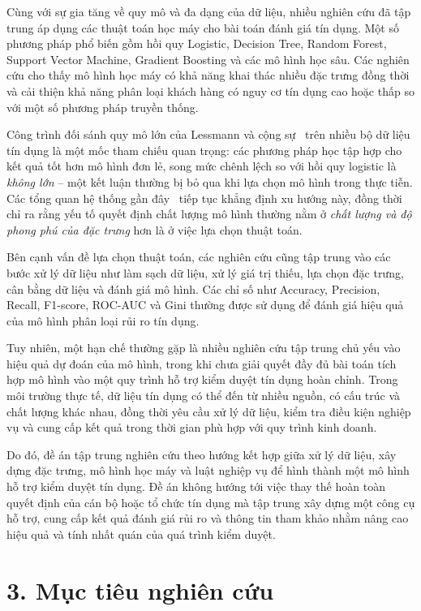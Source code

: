 Cùng với sự gia tăng về quy mô và đa dạng của dữ liệu, nhiều nghiên cứu đã tập
trung áp dụng các thuật toán học máy cho bài toán đánh giá tín dụng. Một số
phương pháp phổ biến gồm hồi quy Logistic, Decision Tree, Random Forest, Support
Vector Machine, Gradient Boosting và các mô hình học sâu. Các nghiên cứu cho thấy
mô hình học máy có khả năng khai thác nhiều đặc trưng đồng thời và cải thiện khả
năng phân loại khách hàng có nguy cơ tín dụng cao hoặc thấp so với một số phương
pháp truyền thống.

Công trình đối sánh quy mô lớn của Lessmann và cộng sự~\cite{lessmann2015} trên
nhiều bộ dữ liệu tín dụng là một mốc tham chiếu quan trọng: các phương pháp học
tập hợp cho kết quả tốt hơn mô hình đơn lẻ, song mức chênh lệch so với hồi quy
logistic là \textit{không lớn} -- một kết luận thường bị bỏ qua khi lựa chọn mô
hình trong thực tiễn. Các tổng quan hệ thống gần đây~\cite{shi2022} tiếp tục
khẳng định xu hướng này, đồng thời chỉ ra rằng yếu tố quyết định chất lượng mô
hình thường nằm ở \textit{chất lượng và độ phong phú của đặc trưng} hơn là ở việc
lựa chọn thuật toán.

Bên cạnh vấn đề lựa chọn thuật toán, các nghiên cứu cũng tập trung vào các bước
xử lý dữ liệu như làm sạch dữ liệu, xử lý giá trị thiếu, lựa chọn đặc trưng, cân
bằng dữ liệu và đánh giá mô hình. Các chỉ số như Accuracy, Precision, Recall,
F1-score, ROC-AUC và Gini thường được sử dụng để đánh giá hiệu quả của mô hình
phân loại rủi ro tín dụng.

Tuy nhiên, một hạn chế thường gặp là nhiều nghiên cứu tập trung chủ yếu vào hiệu
quả dự đoán của mô hình, trong khi chưa giải quyết đầy đủ bài toán tích hợp mô
hình vào một quy trình hỗ trợ kiểm duyệt tín dụng hoàn chỉnh. Trong môi trường
thực tế, dữ liệu tín dụng có thể đến từ nhiều nguồn, có cấu trúc và chất lượng
khác nhau, đồng thời yêu cầu xử lý dữ liệu, kiểm tra điều kiện nghiệp vụ và cung
cấp kết quả trong thời gian phù hợp với quy trình kinh doanh.

Do đó, đề án tập trung nghiên cứu theo hướng kết hợp giữa xử lý dữ liệu, xây dựng
đặc trưng, mô hình học máy và luật nghiệp vụ để hình thành một mô hình hỗ trợ
kiểm duyệt tín dụng. Đề án không hướng tới việc thay thế hoàn toàn quyết định của
cán bộ hoặc tổ chức tín dụng mà tập trung xây dựng một công cụ hỗ trợ, cung cấp
kết quả đánh giá rủi ro và thông tin tham khảo nhằm nâng cao hiệu quả và tính
nhất quán của quá trình kiểm duyệt.

\section*{3. Mục tiêu nghiên cứu}

